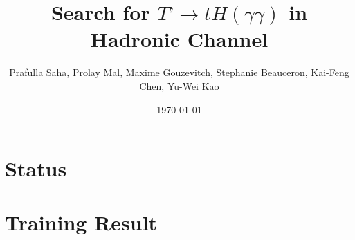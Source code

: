 \documentclass[usenames,dvipsnames]{beamer} %
\title{Search for $T’ \to tH(\gamma\gamma)$ in Hadronic Channel}
\author{Prafulla Saha, Prolay Mal, Maxime Gouzevitch, Stephanie Beauceron, Kai-Feng Chen, Yu-Wei Kao}
\institute{National Taiwan University}
\date{\today}
\begin{document}
\frame{\titlepage}

\section{Status}


\section{Training Result}


%
%
%
%
%
%
%
%
%
%
%
%
%
%
%
%
%
%
%
%
%
%
%
%
%
%
%
%
%
%
%
%
%
%
%
%
%
%
%
\end{document}
